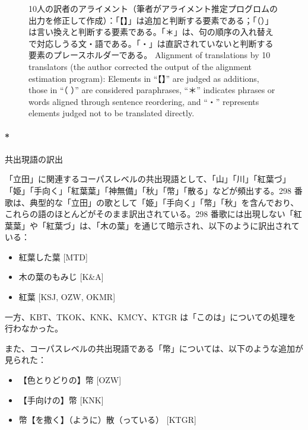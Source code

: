 \documentclass[
  letterpaper,
  DIV=11,
  numbers=noendperiod]{scrartcl}
\let\oldparagraph\paragraph
\renewcommand{\paragraph}[1]{\oldparagraph{#1}\mbox{}}
\providecommand{\tightlist}{%
  \setlength{\itemsep}{0pt}\setlength{\parskip}{0pt}}\usepackage{longtable,booktabs,array}
\begin{document}
\begin{figure}
\begin{minipage}{\linewidth}
{}


\end{minipage}%

\caption{\label{fig-alignment}10人の訳者のアライメント（筆者がアライメント推定プログロムの出力を修正して作成）：「【】」は追加と判断する要素である；「（）」は言い換えと判断する要素である。「＊」は、句の順序の入れ替えで対応しうる文・語である。「・」は直訳されていないと判断する要素のプレースホルダーである。
Alignment of translations by 10 translators (the author corrected the
output of the alignment estimation program): Elements in ``【】'' are
judged as additions, those in ``（ ）'' are considered paraphrases,
``＊'' indicates phrases or words aligned through sentence reordering,
and ``・'' represents elements judged not to be translated directly.}

\end{figure}%

\paragraph*{共出現語の訳出}\label{ux5171ux51faux73feux8a9eux306eux8a33ux51fa}

「立田」に関連するコーパスレベルの共出現語として、「山」「川」「紅葉づ」「姫」「手向く」「紅葉葉」「神無備」「秋」「幣」「散る」などが頻出する。298
番歌は、典型的な「立田」の歌として「姫」「手向く」「幣」「秋」を含んでおり、これらの語のほとんどがそのまま訳出されている。298
番歌には出現しない「紅葉葉」や「紅葉づ」は、「木の葉」を通じて暗示され、以下のように訳出されている：

\begin{itemize}
\tightlist
\item
  紅葉した葉 {[}MTD{]}
\item
  木の葉のもみじ {[}K\&A{]}
\item
  紅葉 {[}KSJ, OZW, OKMR{]}
\end{itemize}

一方、KBT、TKOK、KNK、KMCY、KTGR
は「このは」についての処理を行わなかった。

また、コーパスレベルの共出現語である「幣」については、以下のような追加が見られた：

\begin{itemize}
\tightlist
\item
  【色とりどりの】幣 {[}OZW{]}
\item
  【手向けの】幣 {[}KNK{]}
\item
  幣【を撒く】（ように）散（っている） {[}KTGR{]}
\end{itemize}
\end{document}
